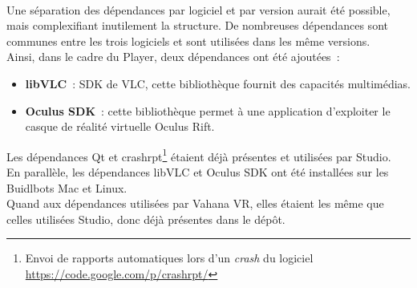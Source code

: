\ \\
Une séparation
des dépendances par logiciel et par version aurait été possible, mais complexifiant inutilement 
la structure. De nombreuses dépendances sont communes entre les trois logiciels et
sont utilisées dans les même versions. \\
\newline
Ainsi, dans le cadre du Player, deux dépendances ont été ajoutées~:
\begin{itemize}
  \item \textbf{libVLC}~: SDK de VLC, cette bibliothèque fournit des capacités multimédias.\cite{libvlc}
  \item \textbf{Oculus SDK}~: cette bibliothèque permet à une application d'exploiter le 
  casque de réalité virtuelle Oculus Rift.\cite{oculus-developer-guide}
\end{itemize}
Les dépendances Qt et crashrpt\footnote{Envoi de rapports automatiques lors d'un
\textit{crash} du logiciel \url{https://code.google.com/p/crashrpt/}} étaient déjà 
présentes et utilisées par Studio.\\
En parallèle, les dépendances libVLC et Oculus SDK ont été installées sur les Buidlbots Mac et Linux.\\
Quand aux dépendances utilisées par Vahana VR, elles étaient les même que celles 
utilisées Studio, donc déjà présentes dans le dépôt.\\

